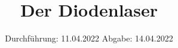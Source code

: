 

\subject{V60}
\title{Der Diodenlaser}
\date{%
  Durchführung: 11.04.2022
  \hspace{3em}
  Abgabe: 14.04.2022
}



\maketitle
\thispagestyle{empty}
\tableofcontents
\newpage






\printbibliography{}


